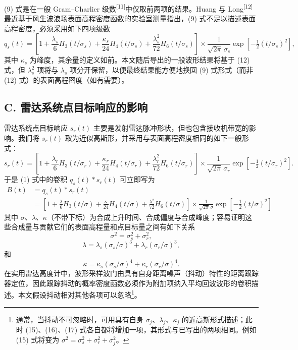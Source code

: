 (9) 式是在一般 Gram--Charlier 级数\textsuperscript{[11]}中仅取前两项的结果。Huang 与 Long\textsuperscript{[12]}最近基于风生波浪场表面高程密度函数的实验室测量指出，(9) 式不足以描述表面高程密度，必须采用如下四项级数
\[
q_{s}(t) = \left[1 + \frac{\lambda_{s}}{6}H_{3}(t/\sigma_{s}) + \frac{\kappa_{s}}{24}H_{4}(t/\sigma_{s}) + \frac{\lambda_{s}^{2}}{72}H_{6}(t/\sigma_{s})\right]
\times \frac{1}{\sqrt{2\pi}\,\sigma_{s}}\exp\left[-\tfrac{1}{2}\left(t/\sigma_{s}\right)^{2}\right],
\tag{12}
\]
其中 $\kappa_{s}$ 为峰度，其余量的定义如前。本文随后导出的一般波形结果将基于 (12) 式，但 $\lambda_{s}^{2}$ 项将与 $\lambda_{s}$ 项分开保留，以便最终结果能方便地换回 (9) 式形式（而非 (12) 式）的表面高程密度（如有需要）。

\subsection*{C. 雷达系统点目标响应的影响}

雷达系统点目标响应 $s_{r}(t)$ 主要是发射雷达脉冲形状，但也包含接收机带宽的影响。我们将 $s_{r}(t)$ 取为近似高斯形，并采用与表面高程密度相同的如下一般形式：
\[
s_{r}(t) = \left[1 + \frac{\lambda_{r}}{6}H_{3}(t/\sigma_{r}) + \frac{\kappa_{r}}{24}H_{4}(t/\sigma_{r}) + \frac{\lambda_{r}^{2}}{72}H_{6}(t/\sigma_{r})\right]
\times \frac{1}{\sqrt{2\pi}\,\sigma_{r}}\exp\left[-\tfrac{1}{2}\left(t/\sigma_{r}\right)^{2}\right].
\tag{13}
\]
于是 (1) 式中的卷积 $q_{s}(t)*s_{r}(t)$ 可立即写为
\[
\begin{aligned}
B(t) &= q_{s}(t)*s_{r}(t) \\
&= \left[1 + \frac{\lambda}{6}H_{3}(t/\sigma) + \frac{\kappa}{24}H_{4}(t/\sigma) + \frac{\lambda^{2}}{72}H_{6}(t/\sigma)\right]
\times \frac{1}{\sqrt{2\pi}\,\sigma}\exp\left[-\tfrac{1}{2}\left(t/\sigma\right)^{2}\right]
\end{aligned}
\tag{14}
\]
其中 $\sigma$、$\lambda$、$\kappa$（不带下标）为合成上升时间、合成偏度与合成峰度；容易证明这些合成量与贡献它们的表面高程量和点目标量之间有如下关系
\[
\sigma^{2} = \sigma_{s}^{2} + \sigma_{r}^{2},
\tag{15}
\]
\[
\lambda = \lambda_{s}(\sigma_{s}/\sigma)^{3} + \lambda_{r}(\sigma_{r}/\sigma)^{3},
\tag{16}
\]
和
\[
\kappa = \kappa_{s}(\sigma_{s}/\sigma)^{4} + \kappa_{r}(\sigma_{r}/\sigma)^{4}.
\tag{17}
\]
在实用雷达高度计中，波形采样波门由具有自身距离噪声（抖动）特性的距离跟踪器定位，因此跟踪抖动的概率密度函数必须作为附加项纳入平均回波波形的卷积描述。本文假设抖动相对其他各项可以忽略\footnote{通常，当抖动不可忽略时，可用具有自身 $\sigma_{j}$、$\lambda_{j}$、$\kappa_{j}$ 的近高斯形式描述；此时 (15)、(16)、(17) 式各自都将增加一项，其形式与已写出的两项相同。例如 (15) 式将变为 $\sigma^{2} = \sigma_{s}^{2} + \sigma_{r}^{2} + \sigma_{j}^{2}$。}。


